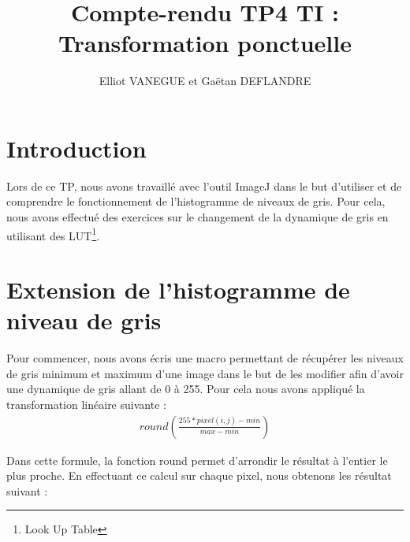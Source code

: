 \documentclass[a4paper,11pt]{article}
\title{Compte-rendu TP4 TI : Transformation ponctuelle}
\author{Elliot VANEGUE et Gaëtan DEFLANDRE}
\begin{document}


  \maketitle
  
  \mbox{}
  \newpage
  \clearpage
  
  \section*{Introduction}
  Lors de ce TP, nous avons travaillé avec l'outil ImageJ dans le but d'utiliser et de comprendre
  le fonctionnement de l'histogramme de niveaux de gris. Pour cela, nous avons effectué des exercices 
  sur le changement de la dynamique de gris en utilisant des LUT\footnote{Look Up Table}.

  \section{Extension de l'histogramme de niveau de gris}
  Pour commencer, nous avons écris une macro permettant de récupérer les niveaux de gris minimum et 
  maximum d'une image dans le but de les modifier afin d'avoir une dynamique de gris allant de 
  0 à 255. Pour cela nous avons appliqué la transformation linéaire suivante : 
  \begin{align*}
   round\left(\frac{255 * pixel(i,j) - min}{max - min}\right)
  \end{align*}

  Dans cette formule, la fonction round permet d'arrondir le résultat à l'entier le plus proche.
  En effectuant ce calcul sur chaque pixel, nous obtenons les résultat suivant :\\
  
\end{document}
